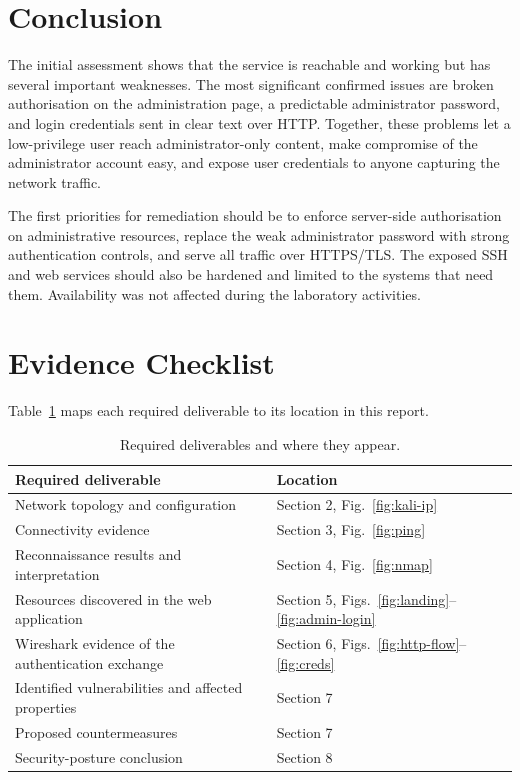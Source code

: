 \section{Conclusion}

The initial assessment shows that the service is reachable and working but has
several important weaknesses. The most significant confirmed issues are broken
authorisation on the administration page, a predictable administrator password,
and login credentials sent in clear text over HTTP. Together, these problems let
a low-privilege user reach administrator-only content, make compromise of the
administrator account easy, and expose user credentials to anyone capturing the
network traffic.

The first priorities for remediation should be to enforce server-side
authorisation on administrative resources, replace the weak administrator
password with strong authentication controls, and serve all traffic over
HTTPS/TLS. The exposed SSH and web services should also be hardened and limited
to the systems that need them. Availability was not affected during the
laboratory activities.

\appendix
\section{Evidence Checklist}

Table~\ref{tab:checklist} maps each required deliverable to its location in this
report.

\begin{table}[H]
\centering
\caption{Required deliverables and where they appear.}
\label{tab:checklist}
\begin{tabularx}{\textwidth}{@{}Xl@{}}
\toprule
\textbf{Required deliverable} & \textbf{Location} \\
\midrule
Network topology and configuration            & Section 2, Fig.~\ref{fig:kali-ip} \\
Connectivity evidence                         & Section 3, Fig.~\ref{fig:ping} \\
Reconnaissance results and interpretation     & Section 4, Fig.~\ref{fig:nmap} \\
Resources discovered in the web application    & Section 5, Figs.~\ref{fig:landing}--\ref{fig:admin-login} \\
Wireshark evidence of the authentication exchange & Section 6, Figs.~\ref{fig:http-flow}--\ref{fig:creds} \\
Identified vulnerabilities and affected properties & Section 7 \\
Proposed countermeasures                      & Section 7 \\
Security-posture conclusion                    & Section 8 \\
\bottomrule
\end{tabularx}
\end{table}
